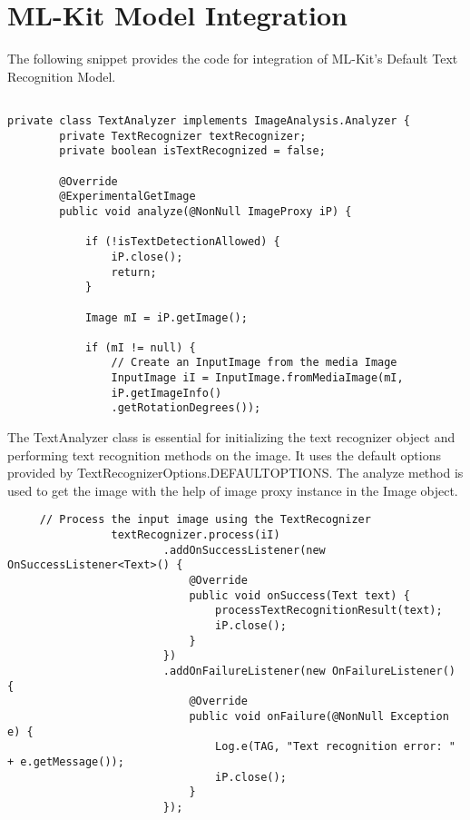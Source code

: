 \documentclass[MScCS]{uccthesis}
\begin{document}
 \section{ML-Kit Model Integration}
 The following snippet provides the code for integration of ML-Kit's Default Text Recognition Model.
 
 \begin{scriptsize}
     \begin{verbatim}

private class TextAnalyzer implements ImageAnalysis.Analyzer {
        private TextRecognizer textRecognizer;
        private boolean isTextRecognized = false;

        @Override
        @ExperimentalGetImage
        public void analyze(@NonNull ImageProxy iP) {
            
            if (!isTextDetectionAllowed) {
                iP.close();
                return;
            }

            Image mI = iP.getImage();

            if (mI != null) {
                // Create an InputImage from the media Image
                InputImage iI = InputImage.fromMediaImage(mI,
                iP.getImageInfo()
                .getRotationDegrees());
                     \end{verbatim}
 \end{scriptsize}

 The TextAnalyzer class is essential for initializing the text recognizer object and performing text recognition methods on the image. It uses the default options provided by TextRecognizerOptions.DEFAULTOPTIONS. The analyze method is used to get the image with the help of image proxy instance in the Image object.
 \begin{scriptsize}
     \begin{verbatim}
     // Process the input image using the TextRecognizer
                textRecognizer.process(iI)
                        .addOnSuccessListener(new OnSuccessListener<Text>() {
                            @Override
                            public void onSuccess(Text text) {
                                processTextRecognitionResult(text);
                                iP.close();
                            }
                        })
                        .addOnFailureListener(new OnFailureListener() {
                            @Override
                            public void onFailure(@NonNull Exception e) {
                                Log.e(TAG, "Text recognition error: " + e.getMessage());
                                iP.close();
                            }
                        });
            
         
     \end{verbatim}
 \end{scriptsize}
\end{document}
